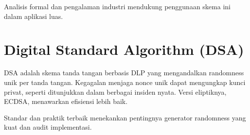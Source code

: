 \documentclass[../main.tex]{subfiles}
\begin{document}
Analisis formal dan pengalaman industri mendukung penggunaan skema ini dalam aplikasi luas.

\section{Digital Standard Algorithm (DSA)}
DSA adalah skema tanda tangan berbasis DLP yang mengandalkan randomness unik per tanda tangan. Kegagalan menjaga nonce unik dapat mengungkap kunci privat, seperti ditunjukkan dalam berbagai insiden nyata. Versi eliptiknya, ECDSA, menawarkan efisiensi lebih baik.

Standar dan praktik terbaik menekankan pentingnya generator randomness yang kuat dan audit implementasi.
\end{document}
